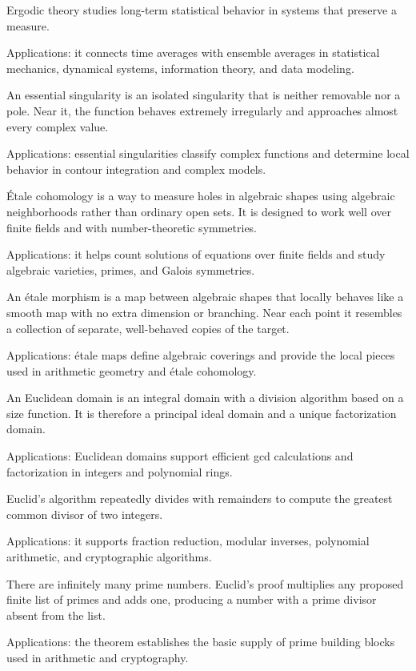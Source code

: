 Ergodic theory studies long-term statistical behavior in systems that preserve a measure. \par\noindent Applications: it connects time averages with ensemble averages in statistical mechanics, dynamical systems, information theory, and data modeling.

An essential singularity is an isolated singularity that is neither removable nor a pole. Near it, the function behaves extremely irregularly and approaches almost every complex value. \par\noindent Applications: essential singularities classify complex functions and determine local behavior in contour integration and complex models.

Étale cohomology is a way to measure holes in algebraic shapes using algebraic neighborhoods rather than ordinary open sets. It is designed to work well over finite fields and with number-theoretic symmetries. \par\noindent Applications: it helps count solutions of equations over finite fields and study algebraic varieties, primes, and Galois symmetries.

An étale morphism is a map between algebraic shapes that locally behaves like a smooth map with no extra dimension or branching. Near each point it resembles a collection of separate, well-behaved copies of the target. \par\noindent Applications: étale maps define algebraic coverings and provide the local pieces used in arithmetic geometry and étale cohomology.

An Euclidean domain is an integral domain with a division algorithm based on a size function. It is therefore a principal ideal domain and a unique factorization domain. \par\noindent Applications: Euclidean domains support efficient gcd calculations and factorization in integers and polynomial rings.

Euclid's algorithm repeatedly divides with remainders to compute the greatest common divisor of two integers. \par\noindent Applications: it supports fraction reduction, modular inverses, polynomial arithmetic, and cryptographic algorithms.

There are infinitely many prime numbers. Euclid's proof multiplies any proposed finite list of primes and adds one, producing a number with a prime divisor absent from the list. \par\noindent Applications: the theorem establishes the basic supply of prime building blocks used in arithmetic and cryptography.

